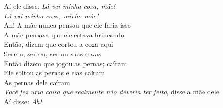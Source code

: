 \begin{linenumbers}\begingroup\raggedright
\noindent Aí ele disse: \emph{Lá vai minha coxa, mãe!}\\
\emph{Lá vai minha coxa, minha mãe!}\\
Ah! A mãe nunca pensou que ele faria isso\\
A mãe pensava que ele estava brincando\\
Então, dizem que cortou a coxa aqui\\
Serrou, serrou, serrou suas coxas\\
Então dizem que jogou as pernas; caíram\\
Ele soltou as pernas e elas caíram\\
As pernas dele caíram\\
\emph{Você fez uma coisa que realmente não deveria ter feito}, disse a mãe dele\\
Aí disse: \emph{Ah!}
\end{linenumbers}\endgroup

\bigskip

